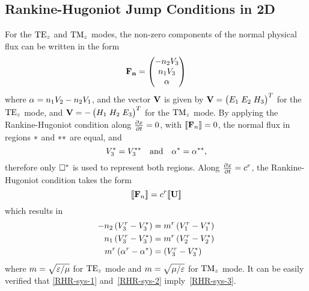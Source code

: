 \subsection{Rankine-Hugoniot Jump Conditions in 2D}
For the $\textrm{TE}_{z}$ and $\textrm{TM}_{z}$ modes, the non-zero components of the normal physical flux can be
written in the form
$$
\mathbf{\mathbf{F}_n} = 
\begin{pmatrix}
  - n_2 V_3 \\
  n_1 V_3 \\
  \alpha
\end{pmatrix}
$$
where $ \alpha = n_1 V_2 - n_2 V_1 $, and the vector $\mathbf{V}$ is given by $
\mathbf{V} = 
  \begin{pmatrix} 
    E_1 \; E_2 \; H_3
  \end{pmatrix}^T
$ for the $\textrm{TE}_{z}$ mode, and $
\mathbf{V} = 
  -
  \begin{pmatrix} 
    H_1 \; H_2 \; E_3
  \end{pmatrix}^T
  $ for the $\textrm{TM}_{z}$ mode.
By applying the Rankine-Hugoniot condition along $\frac{\partial x}{\partial t} = 0$, with $ \llbracket  \mathbf{F}_n  \rrbracket = 0 $, the normal flux in regions $*$ and $**$ are equal, and
\begin{equation*}
  V_3^* = V_3^{**} \quad \text{and} \quad \alpha^* = \alpha^{**},
\end{equation*}
therefore only $\Box^*$ is used to represent both regions.
Along $\frac{\partial x}{\partial t} = c^r$, the Rankine-Hugoniot condition takes the form
$$
\llbracket  \mathbf{F}_n  \rrbracket = c^r \llbracket  \mathbf{U}  \rrbracket
$$
which results in
\begin{align}
-n_2 \left(V_3^r - V_3^* \right) &= m^r \left( V_1^r - V_1^* \right) \label{RHR-sys-1} \\
n_1 \left(V_3^r - V_3^* \right) &= m^r  \left( V_2^r - V_2^* \right) \label{RHR-sys-2} \\
m^r \left(\alpha^r - \alpha^* \right) &= \left( V_3^r - V_3^* \right) \label{RHR-sys-3}
\end{align}
where $m = \sqrt{\varepsilon/\mu}$ for $\textrm{TE}_{z}$ mode and $m =
\sqrt{\mu/\varepsilon}$ for $\textrm{TM}_{z}$ mode. It can be easily verified that
\eqref{RHR-sys-1} and~\eqref{RHR-sys-2} imply~\eqref{RHR-sys-3}.

